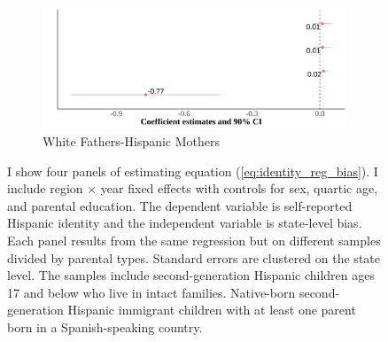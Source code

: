 \documentclass[12pt,english]{article}
\begin{document}
\begin{center}
\begin{figure}[!htb]
\begin{subfigure}{.48\textwidth}
\caption{White Fathers-Hispanic Mothers}
\centering
\includegraphics[width=.9\linewidth]{figure/by-parents-regs-wh.png}
\end{subfigure}
\caption*{\footnotesize{I show four panels of estimating equation (\ref{eq:identity_reg_bias}). I include region $\times$ year fixed effects with controls for sex, quartic age, and parental education. The dependent variable is self-reported Hispanic identity and the independent variable is state-level bias. Each panel results from the same regression but on different samples divided by parental types. Standard errors are clustered on the state level. The samples include second-generation Hispanic children ages 17 and below who live in intact families. Native-born second-generation Hispanic immigrant children with at least one parent born in a Spanish-speaking country.}}
\end{figure}
\end{center}

\pagebreak
\newpage
\end{document}
